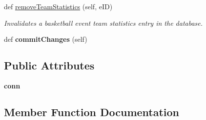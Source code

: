 \begin{DoxyCompactItemize}
def \hyperlink{classhandler_1_1dao_1_1basketball__event__dao_1_1_basketball_event_d_a_o_a53a9c4458e7f34993801713a0d8e622b}{remove\+Team\+Statistics} (self, e\+ID)
\begin{DoxyCompactList}\small\item\em Invalidates a basketball event team statistics entry in the database. \end{DoxyCompactList}\item 
\mbox{\label{classhandler_1_1dao_1_1basketball__event__dao_1_1_basketball_event_d_a_o_a52abde828fc9186c9494842e27ec2570}} 
def {\bfseries commit\+Changes} (self)
\end{DoxyCompactItemize}
\subsection*{Public Attributes}
\begin{DoxyCompactItemize}
\item 
\mbox{\label{classhandler_1_1dao_1_1basketball__event__dao_1_1_basketball_event_d_a_o_aac133a36e5c1484ff7df90ab0144f039}} 
{\bfseries conn}
\end{DoxyCompactItemize}


\subsection{Member Function Documentation}
\mbox{\label{classhandler_1_1dao_1_1basketball__event__dao_1_1_basketball_event_d_a_o_a4027db3b1ac7c6d17dd12d015008f72a}} 
